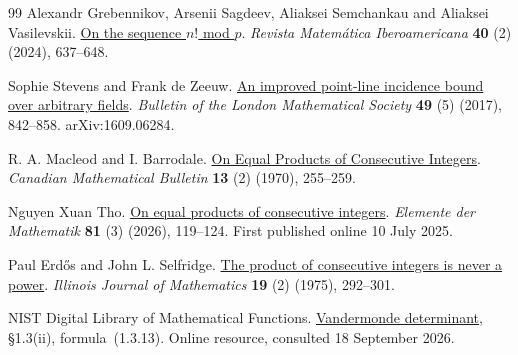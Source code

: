 \begin{thebibliography}{99}
Alexandr Grebennikov, Arsenii Sagdeev, Aliaksei Semchankau and Aliaksei Vasilevskii. \href{https://doi.org/10.4171/RMI/1422}{On the sequence $n!$ mod $p$}.
\emph{Revista Matemática Iberoamericana} \textbf{40} (2) (2024), 637--648.

Sophie Stevens and Frank de Zeeuw. \href{https://doi.org/10.1112/blms.12077}{An improved point-line incidence bound over arbitrary fields}.
\emph{Bulletin of the London Mathematical Society} \textbf{49} (5) (2017), 842--858. arXiv:1609.06284.

R. A. Macleod and I. Barrodale. \href{https://doi.org/10.4153/CMB-1970-052-8}{On Equal Products of Consecutive Integers}.
\emph{Canadian Mathematical Bulletin} \textbf{13} (2) (1970), 255--259.

{Nguyen Xuan Tho}. \href{https://doi.org/10.4171/EM/556}{On equal products of consecutive integers}.
\emph{Elemente der Mathematik} \textbf{81} (3) (2026), 119--124. First published online 10 July 2025.

Paul Erd{\H o}s and John L. Selfridge. \href{https://doi.org/10.1215/ijm/1256050816}{The product of consecutive integers is never a power}.
\emph{Illinois Journal of Mathematics} \textbf{19} (2) (1975), 292--301.

{NIST Digital Library of Mathematical Functions}.
\href{https://dlmf.nist.gov/1.3.E13}{Vandermonde determinant},
\S1.3(ii), formula~(1.3.13). Online resource, consulted 18 September 2026.

\end{thebibliography}

